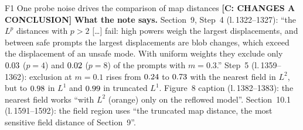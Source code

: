 \documentclass[11pt]{article}
\newcommand{\lin}[1]{l.\,#1}
\newcommand{\badge}[2]{\textcolor{#1}{\textbf{[#2]}}}
\newcommand{\Sconc}{\badge{errRed}{C: CHANGES A CONCLUSION}}
\begin{document}
\begin{findbox}{F1 \quad One probe noise drives the comparison of map distances \hfill \Sconc}
\textbf{What the note says.} Section~9, Step~4 (\lin{1322--1327}): ``the $L^p$ distances with $p>2$ [\dots] fail: high powers
weigh the largest displacements, and between safe prompts the largest displacements are blob changes, which exceed the
displacement of an unsafe mode. With uniform weights they exclude only $0.03$ ($p=4$) and $0.02$ ($p=8$) of the
prompts with $m=0.3$.'' Step~5 (\lin{1359--1362}): exclusion at $m=0.1$ rises from $0.24$ to $0.73$ with the nearest field in
$L^2$, but to $0.98$ in $L^1$ and $0.99$ in truncated $L^1$. Figure~8 caption (\lin{1382--1383}): the nearest field works ``with
$L^2$ (orange) only on the reflowed model''. Section~10.1 (\lin{1591--1592}): the field region uses ``the truncated map
distance, the most sensitive field distance of Section~9''.


\end{findbox}
\end{document}
